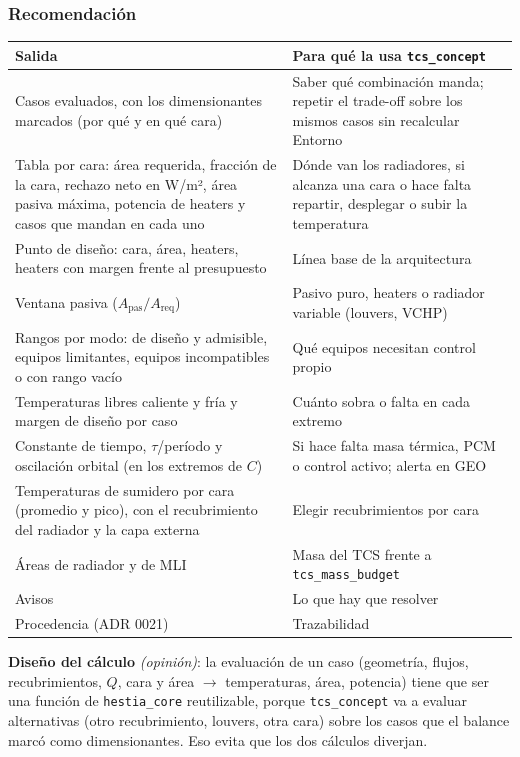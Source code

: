 \documentclass[11pt,a4paper]{article}
\newcommand{\code}[1]{\texttt{#1}}
\newcommand{\op}[1]{\textcolor{opinion}{\textit{(#1)}}}
\begin{document}
\subsubsection*{Recomendación}

{\small
\begin{xltabular}{\textwidth}{@{}LL@{}}
\toprule
\textbf{Salida} & \textbf{Para qué la usa \code{tcs\_concept}} \\
\midrule
\endhead
Casos evaluados, con los dimensionantes marcados (por qué y en qué cara) & Saber qué combinación manda; repetir el trade-off sobre los mismos casos sin recalcular Entorno \\
Tabla por cara: área requerida, fracción de la cara, rechazo neto en W/m², área pasiva máxima, potencia de heaters y casos que mandan en cada uno & Dónde van los radiadores, si alcanza una cara o hace falta repartir, desplegar o subir la temperatura \\
Punto de diseño: cara, área, heaters, heaters con margen frente al presupuesto & Línea base de la arquitectura \\
Ventana pasiva ($A_\mathrm{pas}/A_\mathrm{req}$) & Pasivo puro, heaters o radiador variable (louvers, VCHP) \\
Rangos por modo: de diseño y admisible, equipos limitantes, equipos incompatibles o con rango vacío & Qué equipos necesitan control propio \\
Temperaturas libres caliente y fría y margen de diseño por caso & Cuánto sobra o falta en cada extremo \\
Constante de tiempo, $\tau$/período y oscilación orbital (en los extremos de $C$) & Si hace falta masa térmica, PCM o control activo; alerta en GEO \\
Temperaturas de sumidero por cara (promedio y pico), con el recubrimiento del radiador y la capa externa & Elegir recubrimientos por cara \\
Áreas de radiador y de MLI & Masa del TCS frente a \code{tcs\_mass\_budget} \\
Avisos & Lo que hay que resolver \\
Procedencia (ADR 0021) & Trazabilidad \\
\bottomrule
\end{xltabular}
}

\textbf{Diseño del cálculo} \op{opinión}: la evaluación de un caso (geometría, flujos, recubrimientos, $Q$, cara y área $\to$ temperaturas, área, potencia) tiene que ser una función de \code{hestia\_core} reutilizable, porque \code{tcs\_concept} va a evaluar alternativas (otro recubrimiento, louvers, otra cara) sobre los casos que el balance marcó como dimensionantes. Eso evita que los dos cálculos diverjan.
\end{document}
